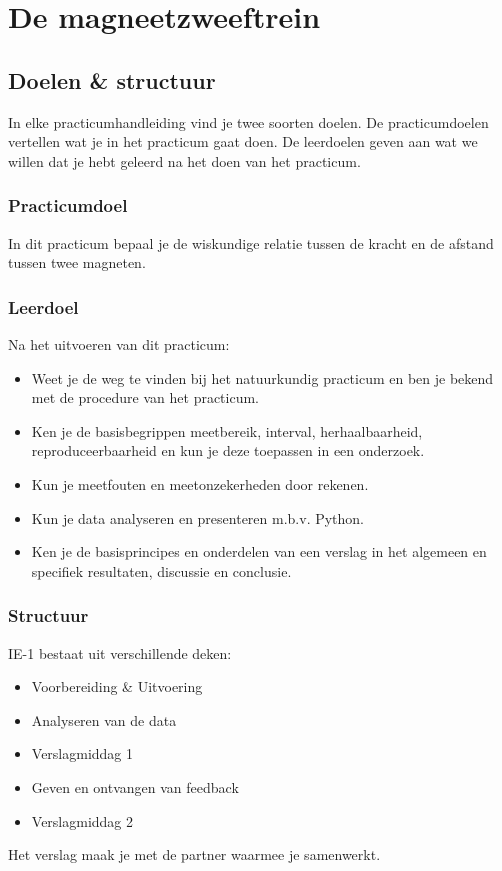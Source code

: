 \chapter{De magneetzweeftrein}
\minitoc
\newpage

\section{Doelen \& structuur}
\begin{framed}
In elke practicumhandleiding vind je twee soorten doelen. De practicumdoelen vertellen wat je in het practicum gaat doen. De leerdoelen geven aan wat we willen dat je hebt geleerd na het doen van het practicum.
\end{framed}
%
\subsection{Practicumdoel}
In dit practicum bepaal je de wiskundige relatie tussen de kracht en de afstand tussen twee magneten.
%
\subsection{Leerdoel}
Na het uitvoeren van dit practicum:
%
\begin{itemize}
    \item Weet je de weg te vinden bij het natuurkundig practicum en ben je bekend met de procedure van het practicum.
    \item Ken je de basisbegrippen meetbereik, interval, herhaalbaarheid, reproduceerbaarheid en kun je deze toepassen in een onderzoek.
    \item Kun je meetfouten en meetonzekerheden door rekenen. 
    \item Kun je data analyseren en presenteren m.b.v. Python.
    \item Ken je de basisprincipes en onderdelen van een verslag in het algemeen en specifiek resultaten, discussie en conclusie.
\end{itemize}
%
\subsection{Structuur}
IE-1 bestaat uit verschillende deken:
%
\begin{itemize}
    \item Voorbereiding \& Uitvoering 
    \item Analyseren van de data
    \item Verslagmiddag 1
    \item Geven en ontvangen van feedback
    \item Verslagmiddag 2
\end{itemize}
%
Het verslag maak je met de partner waarmee je samenwerkt.
%
